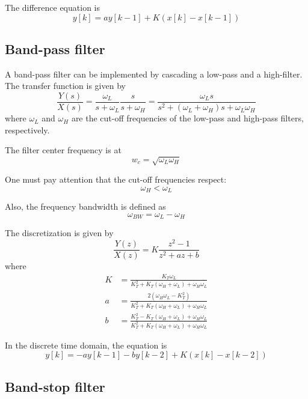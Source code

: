 \documentclass[11pt]{article}
\begin{document}
The difference equation is
\begin{equation}
	y[k] = a y[k-1] + K (x[k] - x[k-1])
\end{equation}


\subsection{Band-pass filter}

A band-pass filter can be implemented by cascading a low-pass and a high-filter.
The transfer function is given by
\begin{equation}
	\frac{Y(s)}{X(s)} = \frac{\omega_L}{s + \omega_L} \frac{s}{s + \omega_H} = \frac{\omega_Ls}{s^2 + (\omega_L + \omega_H)s + \omega_L\omega_H }
\end{equation}
where $\omega_L$ and $\omega_H$ are the cut-off frequencies of the low-pass and high-pass filters, respectively.

The filter center frequency is at
\begin{equation}
	w_c = \sqrt{\omega_L\omega_H}
\end{equation}

One must pay attention that the cut-off frequencies respect: $$\omega_H < \omega_L$$

Also, the frequency bandwidth is defined as
\begin{equation}
	\omega_{BW} = \omega_L - \omega_H
\end{equation}

The discretization is given by
\begin{equation}
	\frac{Y(z)}{X(z)} = K \frac{z^2 - 1}{z^2 + az + b}
\end{equation}
where
\begin{align}
	K &= \frac{K_T\omega_L}{K_T^2 + K_T(\omega_H+\omega_L) +\omega_H\omega_L}\\
	a &= \frac{2(\omega_H\omega_L - K_T^2)}{K_T^2 + K_T(\omega_H+\omega_L) +\omega_H\omega_L}\\
	b &= \frac{K_T^2 - K_T(\omega_H+\omega_L) +\omega_H\omega_L}{K_T^2 + K_T(\omega_H+\omega_L) +\omega_H\omega_L}
\end{align}

In the discrete time domain, the equation is
\begin{equation}
	y[k] = -ay[k-1] - by[k-2] + K(x[k] - x[k-2])
\end{equation}


\subsection{Band-stop filter}
\end{document}

